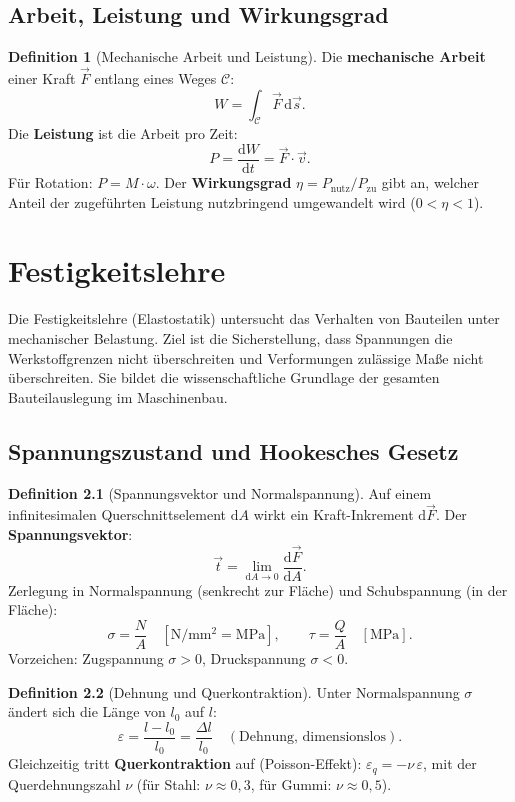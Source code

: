 ﻿\documentclass[a4paper,12pt]{report}
\theoremstyle{definition}
\newtheorem{definition}{Definition}
\begin{document}
\section{Arbeit, Leistung und Wirkungsgrad}

\begin{definition}[Mechanische Arbeit und Leistung]
Die \textbf{mechanische Arbeit} einer Kraft $\vec{F}$ entlang eines Weges $\mathcal{C}$:
\[
  W = \int_{\mathcal{C}} \vec{F}\,\mathrm{d}\vec{s}.
\]
Die \textbf{Leistung} ist die Arbeit pro Zeit:
\[
  P = \frac{\mathrm{d}W}{\mathrm{d}t} = \vec{F}\cdot\vec{v}.
\]
F\"ur Rotation: $P = M\cdot\omega$.
Der \textbf{Wirkungsgrad} $\eta = P_{\text{nutz}}/P_{\text{zu}}$ gibt an,
welcher Anteil der zugef\"uhrten Leistung nutzbringend umgewandelt wird ($0 < \eta < 1$).
\end{definition}

\chapter{Festigkeitslehre}

Die Festigkeitslehre (Elastostatik) untersucht das Verhalten von Bauteilen
unter mechanischer Belastung. Ziel ist die Sicherstellung, dass Spannungen
die Werkstoffgrenzen nicht \"uberschreiten und Verformungen zul\"assige
Ma\ss{}e nicht \"uberschreiten. Sie bildet die wissenschaftliche Grundlage
der gesamten Bauteilauslegung im Maschinenbau.

\section{Spannungszustand und Hookesches Gesetz}

\begin{definition}[Spannungsvektor und Normalspannung]
Auf einem infinitesimalen Querschnittselement $\mathrm{d}A$ wirkt
ein Kraft-Inkrement $\mathrm{d}\vec{F}$. Der \textbf{Spannungsvektor}:
\[
  \vec{t} = \lim_{\mathrm{d}A \to 0}\frac{\mathrm{d}\vec{F}}{\mathrm{d}A}.
\]
Zerlegung in Normalspannung (senkrecht zur Fl\"ache) und Schubspannung (in der Fl\"ache):
\[
  \sigma = \frac{N}{A} \quad [\mathrm{N/mm^2} = \mathrm{MPa}], \qquad
  \tau = \frac{Q}{A} \quad [\mathrm{MPa}].
\]
Vorzeichen: Zugspannung $\sigma > 0$, Druckspannung $\sigma < 0$.
\end{definition}

\begin{definition}[Dehnung und Querkontraktion]
Unter Normalspannung $\sigma$ \"andert sich die L\"ange von $l_0$ auf $l$:
\[
  \varepsilon = \frac{l - l_0}{l_0} = \frac{\Delta l}{l_0} \quad (\text{Dehnung, dimensionslos}).
\]
Gleichzeitig tritt \textbf{Querkontraktion} auf (Poisson-Effekt):
$\varepsilon_q = -\nu\,\varepsilon$, mit der Querdehnungszahl $\nu$
(f\"ur Stahl: $\nu \approx 0{,}3$, f\"ur Gummi: $\nu \approx 0{,}5$).
\end{definition}
\end{document}

